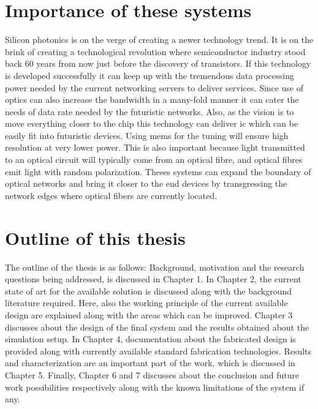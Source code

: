\documentclass[../report.tex]{subfiles}
\begin{document}
	\section{Importance of these systems}
Silicon photonics is on the verge of creating a newer technology trend. It is on the brink of creating a technological revolution where semiconductor industry stood back 60 years from now just before the discovery of transistors. If this technology is developed successfully it can keep up with the tremendous data processing power needed by the current networking servers to deliver services. Since use of optics can also increase the bandwidth in a many-fold manner it can cater the needs of data rate needed by the futuristic networks. Also, as the vision is to move everything closer to the chip this technology can deliver \gls{ic} which can be easily fit into futuristic devices. Using \gls{mems} for the tuning will ensure high resolution at very lower power. This is also important because light transmitted to an optical circuit will typically come from an optical fibre, and optical fibres emit light with random polarization. Theses systems can expand the boundary of optical networks and bring it closer to the end devices by transgressing the network edges where optical fibers are currently located.
	
	\section{Outline of this thesis}
The outline of the thesis is as follows: Background, motivation and the research questions being addressed, is discussed in Chapter 1. In Chapter 2, the current state of art for the available solution is discussed along with the background literature required. Here, also the working principle of the current available design are explained along with the areas which can be improved. Chapter 3 discusses about the design of the final system and the results obtained about the simulation setup. In Chapter 4, documentation about the fabricated design is provided along with currently available standard fabrication technologies. Results and characterization are an important part of the work, which is discussed in Chapter 5. Finally, Chapter 6 and 7 discusses about the conclusion and future work possibilities respectively along with the known limitations of the system if any.  
	
\end{document}
